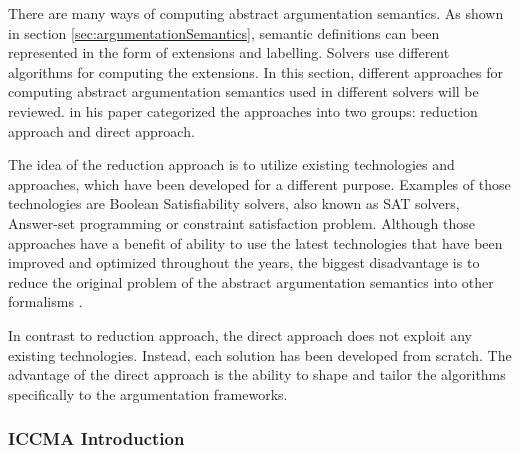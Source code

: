 There are many ways of computing abstract argumentation semantics. As shown in section \ref{sec:argumentationSemantics}, semantic definitions can been represented in the form of extensions and labelling. Solvers use different algorithms for computing the extensions. In this section, different approaches for computing abstract argumentation semantics used in different solvers will be reviewed. \citet{solvingMethods} in his paper categorized the approaches into two groups: reduction approach and direct approach.

The idea of the reduction approach is to utilize existing technologies and approaches, which have been developed for a different purpose. Examples of those technologies are Boolean Satisfiability solvers, also known as SAT solvers, Answer-set programming or constraint satisfaction problem. Although those approaches have a benefit of ability to use the latest technologies that have been improved and optimized throughout the years, the biggest disadvantage is to reduce the original problem of the abstract argumentation semantics into other formalisms \citep{solvingMethods}.

In contrast to reduction approach, the direct approach does not exploit any existing technologies. Instead, each solution has been developed from scratch. The advantage of the direct approach is the ability to shape and tailor the algorithms specifically to the argumentation frameworks.

\subsubsection{ICCMA Introduction}

